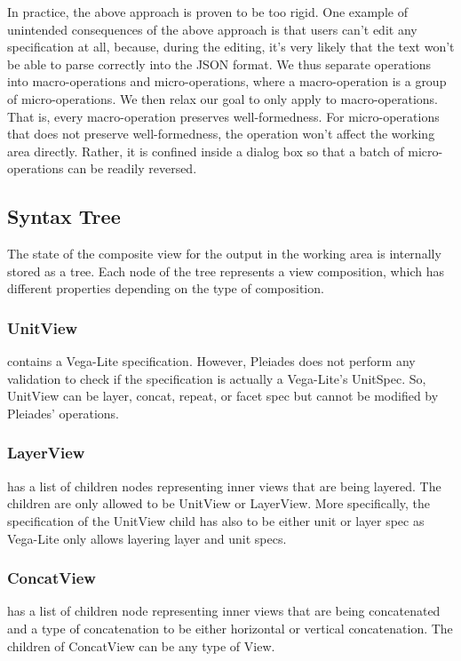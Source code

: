 \documentclass[journal]{vgtc}                %
\begin{document}
In practice, the above approach is proven to be too rigid. One example of
unintended consequences of the above approach is that users can’t edit any
specification at all, because, during the editing, it’s very likely that
the text won’t be able to parse correctly into the JSON format. We thus
separate operations into macro-operations and micro-operations, where a
macro-operation is a group of micro-operations. We then relax our goal to
only apply to macro-operations. That is, every macro-operation preserves
well-formedness. For micro-operations that does not preserve well-formedness,
the operation won’t affect the working area directly. Rather, it is confined
inside a dialog box so that a batch of micro-operations can be readily reversed.

\subsection{Syntax Tree}
The state of the composite view for the output in the working area is internally
stored as a tree. Each node of the tree represents a view composition, which has
different properties depending on the type of composition.

\subsubsection{UnitView} contains a Vega-Lite specification. However, Pleiades does
not perform any validation to check if the specification is actually a Vega-Lite’s
UnitSpec. So, UnitView can be layer, concat, repeat, or facet spec but cannot be
modified by Pleiades’ operations.

\subsubsection{LayerView} has a list of children nodes representing inner views that
are being layered. The children are only allowed to be UnitView or LayerView.
More specifically, the specification of the UnitView child has also to be either
unit or layer spec as Vega-Lite only allows layering layer and unit specs.

\subsubsection{ConcatView} has a list of children node representing inner views that
are being concatenated and a type of concatenation to be either horizontal or
vertical concatenation. The children of ConcatView can be any type of View.
\end{document}
